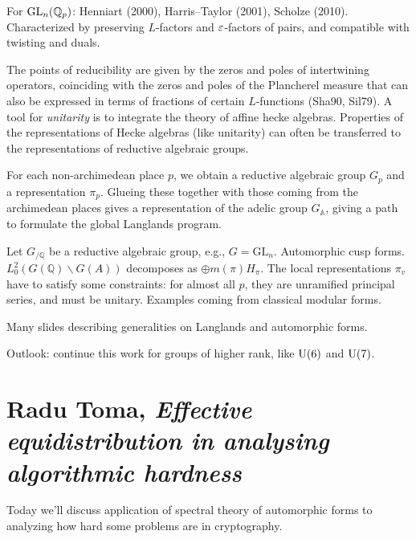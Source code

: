 \documentclass[reqno]{amsart} 
\numberwithin{theorem}{section}
\numberwithin{equation}{section}
\begin{document}
For $\operatorname{GL}_n(\mathbb{Q}_p)$: Henniart (2000), Harris--Taylor (2001), Scholze (2010).  Characterized by preserving $L$-factors and $\varepsilon$-factors of pairs, and compatible with twisting and duals.

The points of reducibility are given by the zeros and poles of intertwining operators, coinciding with the zeros and poles of the Plancherel measure that can also be expressed in terms of fractions of certain $L$-functions (Sha90, Sil79).  A tool for \emph{unitarity} is to integrate the theory of affine hecke algebras.  Properties of the representations of Hecke algebras (like unitarity) can often be transferred to the representations of reductive algebraic groups.

For each non-archimedean place $p$, we obtain a reductive algebraic group $G_p$ and a representation $\pi_p$.  Glueing these together with those coming from the archimedean places gives a representation of the adelic group $G_{\mathbb{A}}$, giving a path to formulate the global Langlands program.

Let $G_{/\mathbb{Q}}$ be a reductive algebraic group, e.g., $G = \mathrm{GL}_n$.  Automorphic cusp forms.  $L_0^2(G(\mathbb{Q}) \backslash G(A))$ decomposes as $\oplus m(\pi) H_\pi$.  The local representations $\pi_v$ have to satisfy some constraints: for almost all $p$, they are unramified principal series, and must be unitary.  Examples coming from classical modular forms.

Many slides describing generalities on Langlands and automorphic forms.

Outlook: continue this work for groups of higher rank, like $\operatorname{U}(6)$ and $\operatorname{U}(7)$.

\section{Radu Toma, \emph{Effective equidistribution in analysing algorithmic hardness}}

Today we'll discuss application of spectral theory of automorphic forms to analyzing how hard some problems are in cryptography.
\end{document}
